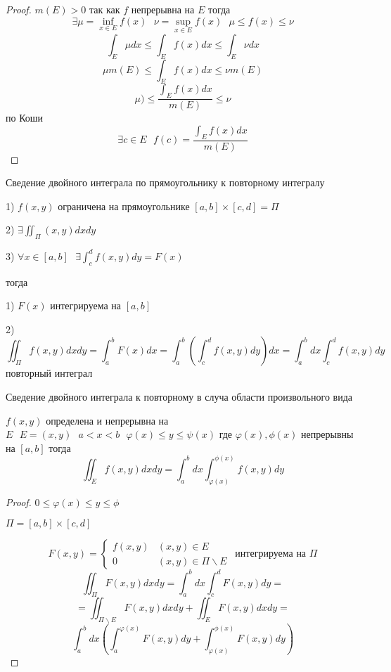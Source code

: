 \begin{proof}
  $m(E) > 0$ так как $f$ непрерывна на $E$ тогда
  $$
  \exists \mu = \inf \limits_{x \in E} f(x) ~~~ \nu = \sup \limits_{x \in E}
  f(x) ~~~ \mu \le f(x) \le \nu
  $$
  $$
  \int_E \mu dx \le \int_E f(x) dx \le \int_E \nu dx
  $$
  $$
  \mu m(E) \le \int_E f(x) dx \le \nu m(E)
  $$
  $$
  \mu) \le \frac{\int_E f(x)dx}{m(E)} \le \nu
  $$
  по Коши
  $$
  \exists c \in E ~~~ f(c) = \frac{\int_E f(x)dx}{m(E)}
  $$
\end{proof}

\begin{title}[\Large]
  Сведение двойного интеграла по прямоугольнику к повторному интегралу
\end{title}

\begin{theorem}
  1) $f(x, y)$ ограничена на прямоугольнике $[a,b] \times [c,d] = \Pi$

  2) $\exists \iint_{\Pi} (x,y)dxdy$

  3) $\forall x \in [a,b] ~~~ \exists \int_c^d f(x,y) dy = F(x)$

  тогда

  1) $F(x)$ интегрируема на $[a,b]$

  2)
  $$
  \iint_{\Pi} f(x, y) dxdy = \int_a^b F(x)dx = \int_a^b \left( \int_c^d f(x,y)
  dy\right)dx = \int_a^b dx \int_c^d f(x,y) dy
  $$
  повторный интеграл
\end{theorem}

\begin{title}[\Large]
  Сведение двойного интеграла к повторному в случа области произвольного вида
\end{title}

\begin{theorem}
  $f(x,y)$ определена и непрерывна на $E ~~~ E = (x,y) ~~~ a < x < b ~~~
  \varphi(x) \le y \le \psi(x)$ где $\varphi(x), \phi(x)$ непрерывны на
  $[a,b]$ тогда
  $$
  \iint_E f(x,y)dxdy = \int_a^b dx \int_{\varphi(x)}^{\phi(x)} f(x,y)dy
  $$
\end{theorem}

\begin{proof}
  $0 \le \varphi(x) \le y \le \phi$

  $\Pi = [a,b] \times [c,d]$

  $$
  F(x,y) =
  \left\{
  \begin{array}{cc}
    f(x,y) &(x,y) \in E \\
    0 & (x,y) \in \Pi \backslash E
  \end{array}
  \right. ~~ \text{интегрируема на $\Pi$}
  $$
  $$
  \iint_{\Pi} F(x,y) dxdy = \int_a^b dx \int_c^d F(x,y) dy =
  $$
  $$
  = \iint_{\Pi \backslash E} F(x,y) dxdy + \iint_E F(x,y)dxdy =
  $$
  $$
  \int_a^b dx \left( \int_a^{\varphi(x)} F(x, y) dy +
  \int_{\varphi(x)}^{\phi(x)} F(x, y) dy \right)
  $$
\end{proof}
